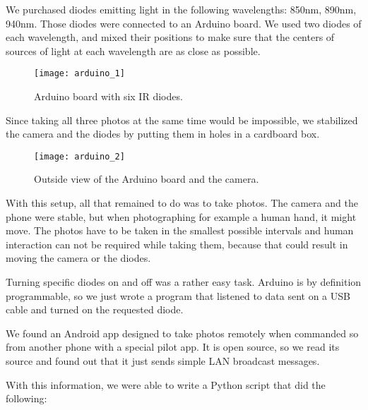             We purchased diodes emitting light in the following wavelengths:
            850nm, 890nm, 940nm. Those diodes were connected to an Arduino board.
            We used two diodes of each wavelength, and mixed their positions to
            make sure that the centers of sources of light at each wavelength
            are as close as possible.

            \begin{figure}[H]
                \caption{Arduino board with six IR diodes.}
                \centering
                \texttt{[image: arduino\_1]}
                \label{fig:arduino_1}
            \end{figure}

            Since taking all three photos at the same time would be impossible,
            we stabilized the camera and the diodes by putting them in holes
            in a cardboard box.

            \begin{figure}[H]
                \caption{Outside view of the Arduino board and the camera.}
                \centering
                \texttt{[image: arduino\_2]}
                \label{fig:arduino_2}
            \end{figure}

            With this setup, all that remained to do was to take photos.
            The camera and the phone were stable, but when photographing for example
            a human hand, it might move.
            The photos have to be taken in the smallest possible intervals
            and human interaction can not be required while taking them,
            because that could result in moving the camera or the diodes.

            Turning specific diodes on and off was a rather easy task.
            Arduino is by definition programmable, so we just wrote a program that
            listened to data sent on a USB cable and turned on the requested diode.

            We found an Android app \cite{opencameraremote} designed to take photos
            remotely when commanded so from another phone with a special pilot app.
            It is open source, so we read its source and found out that it just sends
            simple LAN broadcast messages.

            With this information, we were able to write a Python script that did the
            following:

